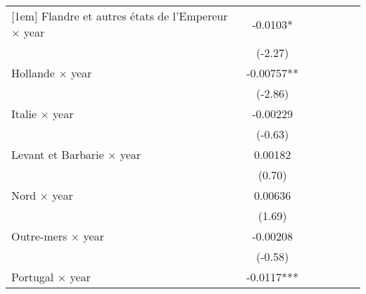 {\begin{tabular}{l*{6}{c}}
[1em]
Flandre et autres états de l'Empereur $\times$ year&     -0.0103*  &                     &                     &                     &                     &                     \\
                    &     (-2.27)         &                     &                     &                     &                     &                     \\
[1em]
Hollande $\times$ year&    -0.00757** &                     &                     &                     &                     &                     \\
                    &     (-2.86)         &                     &                     &                     &                     &                     \\
[1em]
Italie $\times$ year&    -0.00229         &                     &                     &                     &                     &                     \\
                    &     (-0.63)         &                     &                     &                     &                     &                     \\
[1em]
Levant et Barbarie $\times$ year&     0.00182         &                     &                     &                     &                     &                     \\
                    &      (0.70)         &                     &                     &                     &                     &                     \\
[1em]
Nord $\times$ year  &     0.00636         &                     &                     &                     &                     &                     \\
                    &      (1.69)         &                     &                     &                     &                     &                     \\
[1em]
Outre-mers $\times$ year&    -0.00208         &                     &                     &                     &                     &                     \\
                    &     (-0.58)         &                     &                     &                     &                     &                     \\
[1em]
Portugal $\times$ year&     -0.0117***&                     &                     &                     &                     &                     \\

\end{tabular}}
